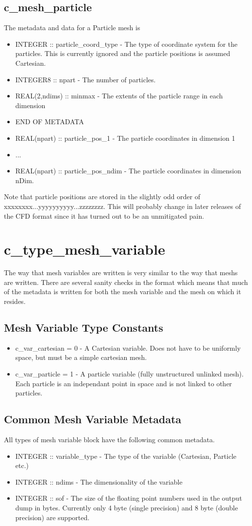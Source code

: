 \documentclass[8pt]{article}
\begin{document}
\subsection{c\_mesh\_particle}
The metadata and data for a Particle mesh is
\begin{itemize}
\item INTEGER :: particle\_coord\_type - The type of coordinate system for the particles. This is currently ignored and the particle positions is assumed Cartesian.
\item INTEGER8 :: npart - The number of particles.
\item REAL(2,ndims) :: minmax - The extents of the particle range in each dimension
\item END OF METADATA
\item REAL(npart) :: particle\_pos\_1 - The particle coordinates in dimension 1
\item ...
\item REAL(npart) :: particle\_pos\_ndim - The particle coordinates in dimension nDim.
\end{itemize}
Note that particle positions are stored in the slightly odd order of xxxxxxxx...yyyyyyyyyy...zzzzzzzz. This will probably change in later releases of the CFD format since it has turned out to be an unmitigated pain.

\section{c\_type\_mesh\_variable}
The way that mesh variables are written is very similar to the way that meshs are written. There are several sanity checks in the format which means that much of the metadata is written for both the mesh variable and the mesh on which it resides.
\subsection{Mesh Variable Type Constants}
\begin{itemize}
\item c\_var\_cartesian = 0 - A Cartesian variable. Does not have to be uniformly space, but must be a simple cartesian mesh.
\item c\_var\_particle = 1 - A particle variable (fully unstructured unlinked mesh). Each particle is an independant point in space and is not linked to other particles.
\end{itemize}
\subsection{Common Mesh Variable Metadata}
All types of mesh variable block have the following common metadata.
\begin{itemize}
  \item INTEGER :: variable\_type - The type of the variable (Cartesian, Particle etc.)
  \item INTEGER :: ndims - The dimensionality of the variable
  \item INTEGER :: sof - The size of the floating point numbers used in the output dump in bytes. Currently only 4 byte (single precision) and 8 byte (double precision) are supported.
\end{itemize}
\end{document}
